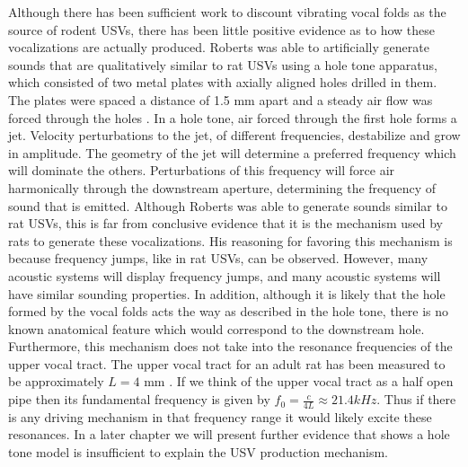 \documentclass[12pt, letter]{report}
\begin{document}
Although there has been sufficient work to discount vibrating vocal folds as the source of rodent USVs, there has been little positive evidence as to how these vocalizations are actually produced. Roberts was able to artificially generate sounds that are qualitatively similar to rat USVs using a hole tone apparatus, which consisted of two metal plates with axially aligned holes drilled in them. The plates were spaced a distance of 1.5 mm apart and a steady air flow was forced through the holes \cite{Roberts1975}. In a hole tone, air forced through the first hole forms a jet. Velocity perturbations to the jet, of different frequencies, destabilize and grow in amplitude. The geometry of the jet will determine a preferred frequency which will dominate the others. Perturbations of this frequency will force air harmonically through the downstream aperture, determining the frequency of sound that is emitted. Although Roberts was able to generate sounds similar to rat USVs, this is far from conclusive evidence that it is the mechanism used by rats to generate these vocalizations. His reasoning for favoring this mechanism is because frequency jumps, like in rat USVs, can be observed. However, many acoustic systems will display frequency jumps, and many acoustic systems will have similar sounding properties. In addition, although it is likely that the hole formed by the vocal folds acts the way as described in the hole tone, there is no known anatomical feature which would correspond to the downstream hole. Furthermore, this mechanism does not take into the resonance frequencies of the upper vocal tract. The upper vocal tract for an adult rat has been measured to be approximately $L=4$ mm \cite{Inagaki2012}. If we think of the upper vocal tract as a half open pipe then its fundamental frequency is given by $f_0=\frac{c}{4L} \approx 21.4 kHz$. Thus if there is any driving mechanism in that frequency range it would likely excite these resonances. In a later chapter we will present further evidence that shows a hole tone model is insufficient to explain the USV production mechanism.
\end{document}
